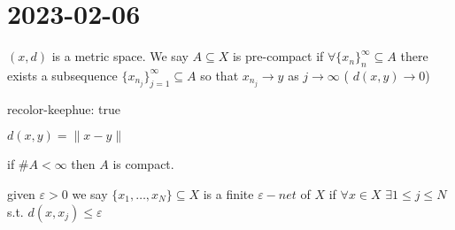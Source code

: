 \section{2023-02-06}

\begin{definition}
	$(x,d)$ is a metric space. We say $A \subseteq X$ is pre-compact if $\forall \{x_n\}_n^{\infty} \subseteq A$ there exists a subsequence 
	$\{ x_{n_j}\}_{j=1}^{\infty} \subseteq A$ 
		so that $x_{n_{j}} \to y$ as $j \to \infty$ 
		( $d(x,y) \to 0$)
\end{definition}
recolor-keephue: true
\begin{example}
	$d(x,y) = \|x - y\|$
\end{example}

\begin{remark}
	if $\#A < \infty$ then $A$ is compact.
\end{remark}

\begin{definition}
	given $\varepsilon > 0$ we say $\{x_1, \ldots, x_N\} \subseteq X$ is a finite $\varepsilon-net$ of $X$ if $\forall x \in X$  $\exists 1 \leq j \leq N$ s.t. $d(x,x_j) \leq \varepsilon$
\end{definition}


